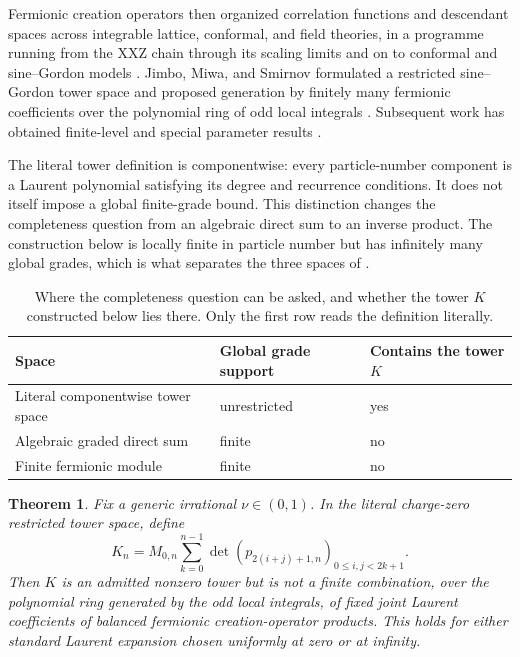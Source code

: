 \documentclass[11pt,reqno]{amsart}
\theoremstyle{plain}
\newtheorem{theorem}{Theorem}[section]
\theoremstyle{definition}
\theoremstyle{remark}
\numberwithin{equation}{section}
\begin{document}
Fermionic creation operators then organized correlation functions and
descendant spaces across integrable lattice, conformal, and field theories,
in a programme running from the XXZ chain through its scaling limits and on
to conformal and sine--Gordon models
\cite{Boos_2005rq,Boos_2006ar,Boos_2007hg,Boos_2009,Jimbo_2010hg,JIMBO_2010oo,Boos_2010hg,Boos_2011fb,Negro_2013rr,Boos_2018nr}.  Jimbo, Miwa, and Smirnov formulated a
restricted sine--Gordon tower space and proposed generation by finitely many
fermionic coefficients over the polynomial ring of odd local integrals
\cite{Jimbo_2011fs}.  Subsequent work has obtained finite-level and special
parameter results \cite{Adler_2025fb,Adler_2026fb}.

The literal tower definition is componentwise: every particle-number
component is a Laurent polynomial satisfying its degree and recurrence
conditions.  It does not itself impose a global finite-grade bound.  This
distinction changes the completeness question from an algebraic direct sum
to an inverse product.  The construction below is locally finite in particle
number but has infinitely many global grades, which is what separates the
three spaces of .

\begin{table}[t]
\centering
\caption{Where the completeness question can be asked, and whether the tower
  $K$ constructed below lies there. Only the first row reads the definition
  literally.}
\label{tab:spaces}
\begin{tabular}{lll}
\toprule
Space & Global grade support & Contains the tower $K$ \\
\midrule
Literal componentwise tower space & unrestricted & yes \\
Algebraic graded direct sum & finite & no \\
Finite fermionic module & finite & no \\
\bottomrule
\end{tabular}
\end{table}

\begin{theorem}\label{thm:fermionic-obstruction}
Fix a generic irrational $\nu\in(0,1)$.  In the literal charge-zero
restricted tower space, define
\[
K_n=M_{0,n}\sum_{k=0}^{n-1}
\det\left(p_{2(i+j)+1,n}\right)_{0\le i,j<2k+1}.
\]
Then $K$ is an admitted nonzero tower but is not a finite combination, over
the polynomial ring generated by the odd local integrals, of fixed joint
Laurent coefficients of balanced fermionic creation-operator products.
This holds for either standard Laurent expansion chosen uniformly at zero or
at infinity.
\end{theorem}
\end{document}
